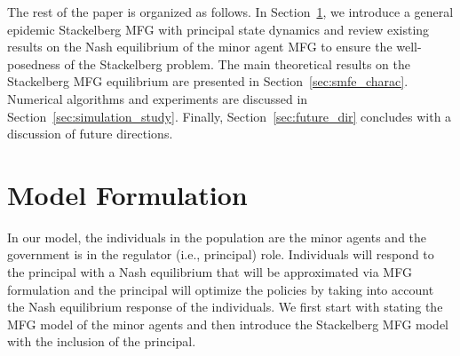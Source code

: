 \documentclass[letterpaper, 10 pt, conference]{ieeeconf}  %
\begin{document}
The rest of the paper is organized as follows. In Section~\ref{sec:sec_model_formulation}, we introduce a general epidemic Stackelberg MFG with principal state dynamics and review existing results on the Nash equilibrium of the minor agent MFG to ensure the well-posedness of the Stackelberg problem. The main theoretical results on the Stackelberg MFG equilibrium are presented in Section~\ref{sec:smfe_charac}. Numerical algorithms and experiments are discussed in Section~\ref{sec:simulation_study}. Finally, Section~\ref{sec:future_dir} concludes with a discussion of future directions.


\section{Model Formulation}
\label{sec:sec_model_formulation}
In our model, the individuals in the population are the minor agents and the government is in the regulator (i.e., principal) role. Individuals will respond to the principal with a Nash equilibrium that will be approximated via MFG formulation and the principal will optimize the policies by taking into account the Nash equilibrium response of the individuals. We first start with stating the MFG model of the minor agents and then introduce the Stackelberg MFG model with the inclusion of the principal. 
\end{document}
